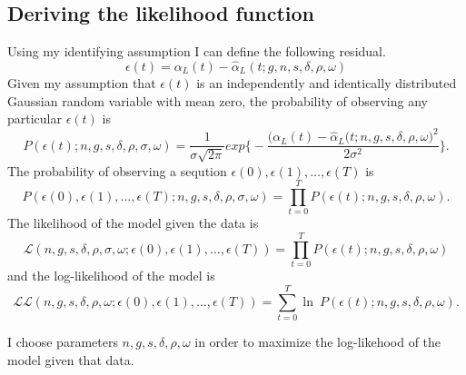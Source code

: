 \documentclass[11pt]{amsart}
\begin{document}
\subsection{Deriving the likelihood function}
Using my identifying assumption I can define the following residual.
\begin{equation}
    \epsilon(t) =  \alpha_L(t) - \hat{\alpha}_L(t; g,n,s,\delta,\rho,\omega)
\end{equation}
Given my assumption that $\epsilon(t)$ is an independently and identically distributed Gaussian random variable with mean zero, the probability of observing any particular $\epsilon(t)$ is
\begin{equation}
    P(\epsilon(t); n,g,s,\delta,\rho,\sigma,\omega) = \frac{1}{\sigma \sqrt{2 \pi}} exp\bigg\{-\frac{\big(\alpha_L(t) - \hat{\alpha}_L(t; n,g,s,\delta,\rho,\omega\big)^2}{2\sigma^2}\bigg\}.
\end{equation}
The probability of observing a seqution $\epsilon(0), \epsilon(1), \dots, \epsilon(T)$ is 
\begin{equation}
    P(\epsilon(0), \epsilon(1), \dots, \epsilon(T); n,g,s,\delta,\rho,\sigma,\omega) = \prod_{t=0}^T P(\epsilon(t); n,g,s,\delta,\rho,\omega).
\end{equation}
The likelihood of the model given the data is
\begin{equation}
    \mathcal{L}(n,g,s,\delta,\rho,\sigma,\omega; \epsilon(0), \epsilon(1), \dots, \epsilon(T)) = \prod_{t=0}^T P(\epsilon(t); n,g,s,\delta,\rho,\omega)
\end{equation}
and the log-likelihood of the model is
\begin{equation}
    \mathcal{LL}(n,g,s,\delta,\rho,\omega; \epsilon(0), \epsilon(1), \dots, \epsilon(T)) = \sum_{t=0}^T \ln\ P(\epsilon(t); n,g,s,\delta,\rho,\omega).
\end{equation}

I choose parameters $n,g,s,\delta,\rho,\omega$ in order to maximize the log-likehood of the model given that data.
\end{document}
